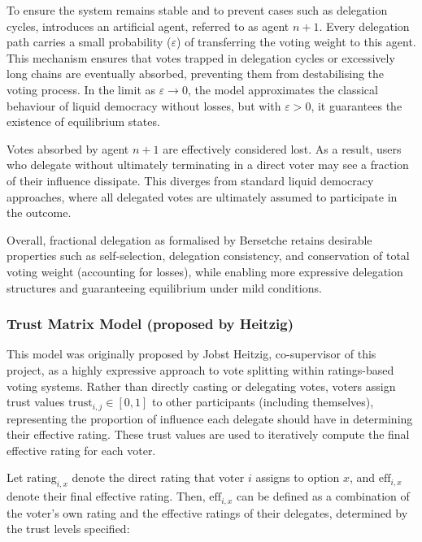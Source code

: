 To ensure the system remains stable and to prevent cases such as delegation cycles, \citeauthor{bersetche2024} introduces an artificial agent, referred to as agent \(n+1\). Every delegation path carries a small probability (\(\varepsilon\)) of transferring the voting weight to this agent. This mechanism ensures that votes trapped in delegation cycles or excessively long chains are eventually absorbed, preventing them from destabilising the voting process. In the limit as \(\varepsilon \to 0\), the model approximates the classical behaviour of liquid democracy without losses, but with \(\varepsilon > 0\), it guarantees the existence of equilibrium states.

Votes absorbed by agent \(n+1\) are effectively considered lost. As a result, users who delegate without ultimately terminating in a direct voter may see a fraction of their influence dissipate. This diverges from standard liquid democracy approaches, where all delegated votes are ultimately assumed to participate in the outcome.

Overall, fractional delegation as formalised by Bersetche retains desirable properties such as self-selection, delegation consistency, and conservation of total voting weight (accounting for losses), while enabling more expressive delegation structures and guaranteeing equilibrium under mild conditions.


\subsubsection*{Trust Matrix Model (proposed by Heitzig)}

This model was originally proposed by Jobst Heitzig, co-supervisor of this project, as a highly expressive approach to vote splitting within ratings-based voting systems. Rather than directly casting or delegating votes, voters assign trust values \( \text{trust}_{i,j} \in [0, 1] \) to other participants (including themselves), representing the proportion of influence each delegate should have in determining their effective rating. These trust values are used to iteratively compute the final effective rating for each voter.

Let \( \text{rating}_{i,x} \) denote the direct rating that voter \( i \) assigns to option \( x \), and \( \text{eff}_{i,x} \) denote their final effective rating. Then, \( \text{eff}_{i,x} \) can be defined as a combination of the voter's own rating and the effective ratings of their delegates, determined by the trust levels specified:

